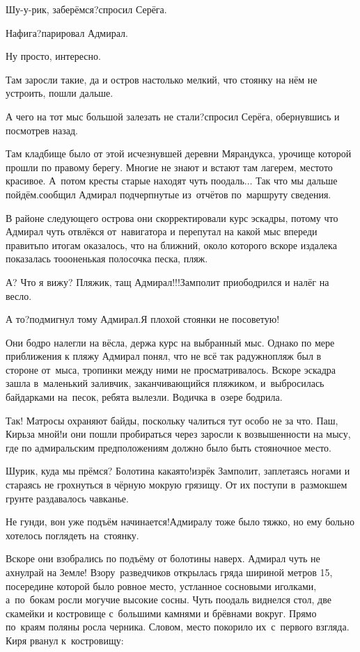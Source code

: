 \diagdash Шу-у-рик, заберёмся?\mdash спросил Серёга.

\diagdash Нафига?\mdash парировал Адмирал.

\diagdash Ну просто, интересно.

\diagdash Там заросли такие, да и остров настолько мелкий, что стоянку на нём не устроить, пошли дальше.

\diagdash А чего на тот мыс большой залезать не стали?\mdash спросил Серёга, обернувшись и посмотрев назад.

\diagdash Там кладбище было от этой исчезнувшей деревни Мярандукса, урочище которой прошли по правому берегу. Многие не знают и встают там лагерем, место\sdash то красивое. А~потом кресты старые находят чуть поодаль$\ldots$ Так что мы дальше пойдём.\mdash сообщил Адмирал подчерпнутые из~отчётов по~маршруту сведения.

В районе следующего острова они скорректировали курс эскадры, потому что Адмирал чуть отвлёкся от~навигатора и перепутал на какой мыс впереди править\mdash по итогам оказалось, что на ближний, около которого вскоре издалека показалась то\sdash о\sdash оненькая полосочка песка, пляж.

\diagdash А? Что я вижу? Пляжик, тащ Адмирал!!!\mdash Замполит приободрился и налёг на весло.

\diagdash А то?\mdash подмигнул тому Адмирал.\mdash Я плохой стоянки не посоветую!

Они бодро налегли на вёсла, держа курс на выбранный мыс. Однако по мере приближения к пляжу Адмирал понял, что не всё так радужно\mdash пляж был в стороне от~мыса, тропинки между ними не просматривалось. Вскоре эскадра зашла в~маленький заливчик, заканчивающийся пляжиком, и~выбросилась байдарками на~песок, ребята вылезли. Водичка в~озере бодрила.

\diagdash Так! Матросы охраняют байды, поскольку чалиться тут особо не за что. Паш, Кирь\mdash за мной!\mdash и они пошли пробираться через заросли к возвышенности на мысу, где по адмиральским предположениям должно было быть стояночное место.

\diagdash Шурик, куда мы прёмся? Болотина какая\sdash то!\mdash изрёк Замполит, заплетаясь ногами и стараясь не грохнуться в чёрную мокрую грязищу. От их поступи в~размокшем грунте раздавалось чавканье.

\diagdash Не гунди, вон уже подъём начинается!\mdash Адмиралу тоже было тяжко, но ему больно хотелось поглядеть на~стоянку. 

Вскоре они взобрались по подъёму от болотины наверх. Адмирал чуть не ахнул\mdash рай на Земле! Взору~разведчиков открылась гряда шириной метров 15, посередине которой было ровное место, устланное сосновыми иголками, а~по~бокам росли могучие высокие сосны. Чуть поодаль виднелся стол, две скамейки и костровище с~большими камнями и брёвнами вокруг. Прямо по~краям поляны росла черника. Словом, место покорило их~с~первого взгляда. Киря рванул к~костровищу:

